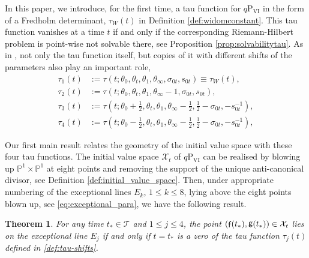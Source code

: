 \documentclass[a4paper,reqno,11pt]{amsart}
\numberwithin{equation}{section}
\numberwithin{figure}{section}
\theoremstyle{plain}
\newtheorem{theorem}{Theorem}[section]
\theoremstyle{remark}
\DeclareMathOperator{\sff}{{\sf f}}
\DeclareMathOperator{\sfg}{{\sf g}}
\newcommand\Psix{\textrm{P}_{\textrm{VI}}}
\numberwithin{rhp}{section}
\begin{document}
In this paper, we introduce, for the first time, a tau function for $q\Psix$ in the form of a Fredholm determinant, 
$\tau_{W}(t)$ in Definition \ref{def:widomconstant}. 
This tau function vanishes at a time $t$ if and only if the corresponding Riemann-Hilbert problem is point-wise not solvable there, see Proposition \ref{prop:solvabilitytau}.
As in \cites{JNS2017,tsudamasuda}, not only the tau function itself, but copies of it with different shifts of the parameters also play an important role,
\begin{equation}\label{def:tau-shifts}
\begin{split}
    \tau_1(t) &:= \tau(t;  \theta_0, \theta_t, \theta_{1}, \theta_{\infty},\sigma_{0t}, s_{0t}) \equiv \tau_{W}(t),\\
    \tau_2(t) &:= \tau(t;  \theta_0, \theta_t, \theta_{1}, \theta_{\infty}-1,\sigma_{0t}, s_{0t}),\\
          \tau_3(t) &:= \tau(t;  \theta_0+\tfrac{1}{2}, \theta_t, \theta_{1}, \theta_{\infty}-\tfrac{1}{2},\tfrac{1}{2}-\sigma_{0t}, -s_{0t}^{-1}),\\
    \tau_4(t) &:= \tau(t;  \theta_0-\tfrac{1}{2}, \theta_t, \theta_{1}, \theta_{\infty}-\tfrac{1}{2},\tfrac{1}{2}-\sigma_{0t}, -s_{0t}^{-1}),
      \end{split}
\end{equation}



Our first main result relates the geometry of the initial value space with these four tau functions.
The initial value space $\mathcal{X}_t$ of $q\Psix$ can be realised by blowing up $\mathbb{P}^1\times \mathbb{P}^1$ at eight points and removing the support of the unique anti-canonical divisor, see Definition \ref{def:initial_value_space}. Then, under appropriate numbering of the exceptional lines $E_k$, $1\leq k\leq 8$, lying above the eight points blown up, see \eqref{eq:exceptional_para}, we have the following result.
\begin{theorem}\label{thm:fundamentalrelationtauRHP}
  For any time $t_*\in \mathcal{T}$ and $1\leq j\leq 4$, the point $(\sff(t_*),\sfg(t_*))\in \mathcal{X}_t$ lies on the exceptional line $E_j$ if and only if $t=t_*$ is a zero of the tau function $\tau_j(t)$ defined in \eqref{def:tau-shifts}.
\end{theorem}
\end{document}
